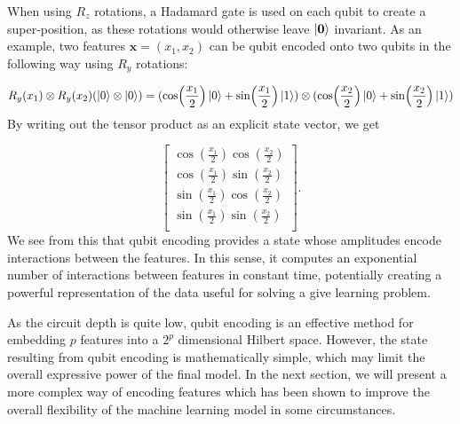 When using $R_z$ rotations, a Hadamard gate is used on each qubit to create a super-position, as these rotations would otherwise leave $\ket{\boldsymbol{0}}$ invariant. As an example, two features $\boldsymbol{x} = (x_1, x_2)$ can be qubit encoded onto two qubits in the following way using $R_y$ rotations:

\begin{equation}
    R_y(x_1)\otimes R_y(x_2) (\ket{0} \otimes \ket{0}) = 
    (\cos(\frac{x_1}{2})\ket{0} + \sin(\frac{x_1}{2})\ket{1})\otimes
    (\cos(\frac{x_2}{2})\ket{0} + \sin(\frac{x_2}{2})\ket{1})
\end{equation}
By writing out the tensor product as an explicit state vector, we get 

\begin{equation}\label{eq:qubit rotation interaction}
\begin{bmatrix}
    \cos(\frac{x_1}{2})\cos(\frac{x_2}{2}) \\
    \cos(\frac{x_1}{2})\sin(\frac{x_2}{2}) \\
    \sin(\frac{x_1}{2})\cos(\frac{x_2}{2}) \\
    \sin(\frac{x_1}{2})\sin(\frac{x_2}{2}) \\
    \end{bmatrix}.
\end{equation}
We see from this that qubit encoding provides a state whose amplitudes encode interactions between the features. In this sense, it computes an exponential number of interactions between features in constant time, potentially creating a powerful representation of the data useful for solving a give learning problem. 

As the circuit depth is quite low, qubit encoding is an effective method for embedding $p$ features into a $2^p$ dimensional Hilbert space. However, the state resulting from qubit encoding is mathematically simple, which may limit the overall expressive power of the final model. In the next section, we will present a more complex way of encoding features which has been shown to improve the overall flexibility of the machine learning model in some circumstances. 



